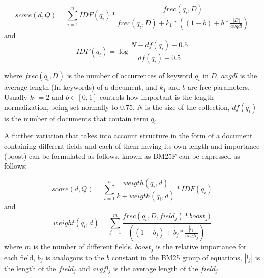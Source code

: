 $$score(d, Q) = \sum_{i=1}^{n}IDF{(q_i)}*\frac{ frec(q_i, D)}{frec(q_i, D)+k_1*((1-b)+b*\frac{|D|}{avgdl})} $$
and $$IDF(q_i) = \log{\frac{N - df(q_i)+0.5}{df(q_i)+0.5}} $$

where $frec(q_i, D)$ is the number of occurrences of keyword $q_i$ in $D$, $avgdl$ is the average length (In keywords) of a document, and $k_1$ and $b$ are free parameters. Usually $k_1 = 2$ and $b \in [0, 1]$ controls how important is the length normalization, being set normally to $0.75$. $N$ is the size of the collection, $df(q_i)$ is the number of documents that contain term $q_i$ 

A further variation that takes into account structure in the form of a document containing different fields and each of them having its own length and importance (boost) can be formulated as follows, known as BM25F can be expressed as follows:

$$score(d, Q) = \sum_{i=1}^{n} \frac{weigth(q_i, d)}{k+ weigth(q_i, d)} * IDF(q_i)$$
and 
$$weight(q_i, d) = \sum_{j=1}^m \frac{frec(q_i, D, field_j)*boost_j)}{((1-b_j) + b_j*\frac{|l_j|}{avgfl_j})} $$
where $m$ is the number of different fields, $boost_j$ is the relative importance for each field, $b_j$ is analogous to the $b$ constant in the BM25 group of equations, $|l_j|$ is the length of the $field_j$ and $avgfl_j$ is the average length of the $field_j$.

